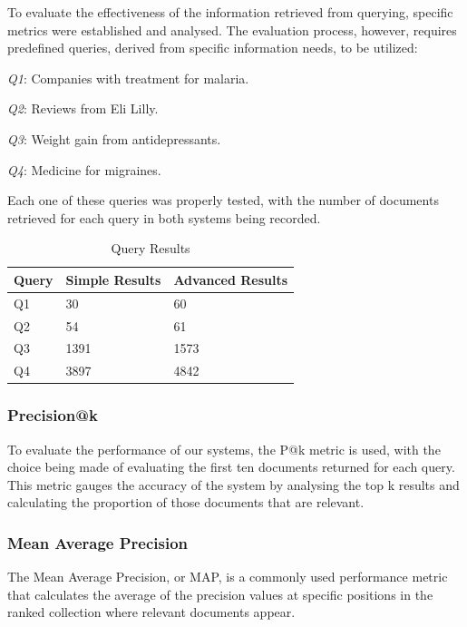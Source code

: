 \documentclass[sigconf]{acmart}
\begin{document}
To evaluate the effectiveness of the information retrieved from querying, specific metrics were established and analysed. The evaluation process, however, requires predefined queries, derived from specific information needs, to be utilized:

\begin{arrowlist}
	\item \textit{Q1}: Companies with treatment for malaria.
	\item \textit{Q2}: Reviews from Eli Lilly.
	\item \textit{Q3}: Weight gain from antidepressants.
	\item \textit{Q4}: Medicine for migraines.
\end{arrowlist}

Each one of these queries was properly tested, with the number of documents retrieved for each query in both systems being recorded.

\begin{table}[H]
	\begin{tabular}{ | m{5em} | m{1cm}| m{1.2cm} | } 
		\hline
		Query& Simple Results & Advanced Results \\ 
		\hline
		Q1 & 30 & 60 \\ 
		\hline
		Q2 & 54 & 61 \\ 
		\hline
		Q3 & 1391 & 1573 \\ 
		\hline
		Q4 & 3897 & 4842 \\ 
		\hline
	\end{tabular}
	\caption{Query Results}
	\label{tab:query_results}
\end{table}

\subsubsection{Precision@k}

To evaluate the performance of our systems, the P@k metric\cite{pak} is used, with the choice being made of evaluating the first ten documents returned for each query. This metric gauges the accuracy of the system by analysing the top k results and calculating the proportion of those documents that are relevant. 

\subsubsection{Mean Average Precision}

The Mean Average Precision\cite{map}, or MAP, is a commonly used performance metric that calculates the average of the precision values at specific positions in the ranked collection where relevant documents appear.
\end{document}

